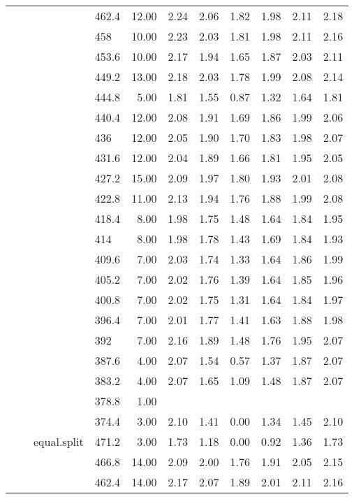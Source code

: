 \begin{longtable}{llllrrrrrrr}
   &  &  & 462.4 & 12.00 & 2.24 & 2.06 & 1.82 & 1.98 & 2.11 & 2.18 \\ 
   &  &  & 458 & 10.00 & 2.23 & 2.03 & 1.81 & 1.98 & 2.11 & 2.16 \\ 
   &  &  & 453.6 & 10.00 & 2.17 & 1.94 & 1.65 & 1.87 & 2.03 & 2.11 \\ 
   &  &  & 449.2 & 13.00 & 2.18 & 2.03 & 1.78 & 1.99 & 2.08 & 2.14 \\ 
   &  &  & 444.8 & 5.00 & 1.81 & 1.55 & 0.87 & 1.32 & 1.64 & 1.81 \\ 
   &  &  & 440.4 & 12.00 & 2.08 & 1.91 & 1.69 & 1.86 & 1.99 & 2.06 \\ 
   &  &  & 436 & 12.00 & 2.05 & 1.90 & 1.70 & 1.83 & 1.98 & 2.07 \\ 
   &  &  & 431.6 & 12.00 & 2.04 & 1.89 & 1.66 & 1.81 & 1.95 & 2.05 \\ 
   &  &  & 427.2 & 15.00 & 2.09 & 1.97 & 1.80 & 1.93 & 2.01 & 2.08 \\ 
   &  &  & 422.8 & 11.00 & 2.13 & 1.94 & 1.76 & 1.88 & 1.99 & 2.08 \\ 
   &  &  & 418.4 & 8.00 & 1.98 & 1.75 & 1.48 & 1.64 & 1.84 & 1.95 \\ 
   &  &  & 414 & 8.00 & 1.98 & 1.78 & 1.43 & 1.69 & 1.84 & 1.93 \\ 
   &  &  & 409.6 & 7.00 & 2.03 & 1.74 & 1.33 & 1.64 & 1.86 & 1.99 \\ 
   &  &  & 405.2 & 7.00 & 2.02 & 1.76 & 1.39 & 1.64 & 1.85 & 1.96 \\ 
   &  &  & 400.8 & 7.00 & 2.02 & 1.75 & 1.31 & 1.64 & 1.84 & 1.97 \\ 
   &  &  & 396.4 & 7.00 & 2.01 & 1.77 & 1.41 & 1.63 & 1.88 & 1.98 \\ 
   &  &  & 392 & 7.00 & 2.16 & 1.89 & 1.48 & 1.76 & 1.95 & 2.07 \\ 
   &  &  & 387.6 & 4.00 & 2.07 & 1.54 & 0.57 & 1.37 & 1.87 & 2.07 \\ 
   &  &  & 383.2 & 4.00 & 2.07 & 1.65 & 1.09 & 1.48 & 1.87 & 2.07 \\ 
   &  &  & 378.8 & 1.00 &  &  &  &  &  &  \\ 
   &  &  & 374.4 & 3.00 & 2.10 & 1.41 & 0.00 & 1.34 & 1.45 & 2.10 \\ 
   &  & equal.split & 471.2 & 3.00 & 1.73 & 1.18 & 0.00 & 0.92 & 1.36 & 1.73 \\ 
   &  &  & 466.8 & 14.00 & 2.09 & 2.00 & 1.76 & 1.91 & 2.05 & 2.15 \\ 
   &  &  & 462.4 & 14.00 & 2.17 & 2.07 & 1.89 & 2.01 & 2.11 & 2.16 \\ 

\end{longtable}
